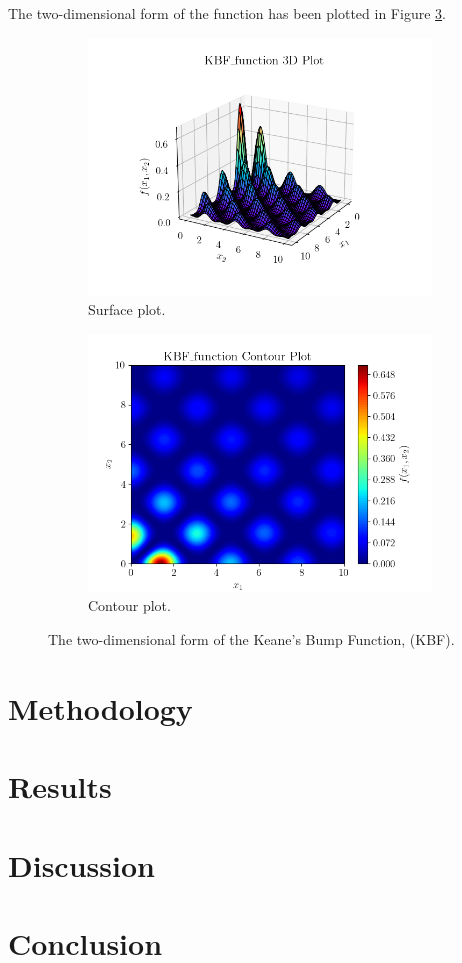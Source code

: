 \documentclass[10pt]{article}
\begin{document}
\begin{multicols}{2}
The two-dimensional form of the function has been plotted in Figure \ref{fig:KBF_2D}.
\begin{figure}[H]
    \centering
    \begin{subfigure}{0.5\textwidth}
        \centering
        \includegraphics[width=\textwidth]{../figures/KBF_function_surf.png}
        \caption{Surface plot.}
        \label{fig:KBF_surf}
    \end{subfigure}
    \begin{subfigure}{0.5\textwidth}
        \centering
        \includegraphics[width=\textwidth]{../figures/KBF_function_contour.png}
        \caption{Contour plot.}
        \label{fig:KBF_contour}
    \end{subfigure}
    \captionsetup{justification=centering}
    \caption{The two-dimensional form of the Keane's Bump Function, (KBF).}
    \label{fig:KBF_2D}
\end{figure}
\end{multicols}

\section{Methodology}
\section{Results}
\section{Discussion}
\section{Conclusion}
\end{document}
